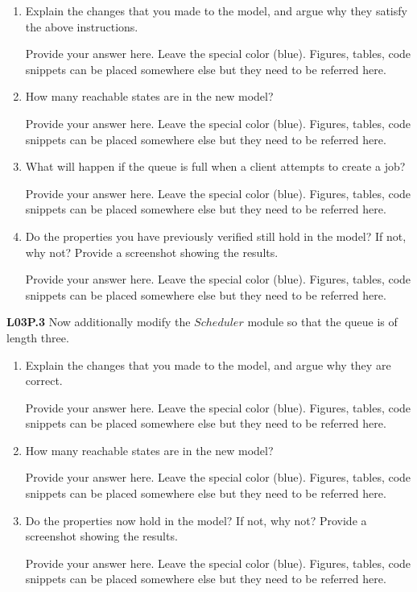 \documentclass[12pt,a4paper]{article}
\newcommand{\prismident}[1]{\mathit{#1}}
\newcommand{\Pname}[1]{\prismident{#1}}
\begin{document}
\begin{description}
\begin{enumerate}[label=\alph*)]
\item Explain the changes that you made to the model, and argue why they satisfy the above instructions.
%
\ifwithanswers
\color{blue}
\par
Provide your answer here. Leave the special color (blue). Figures, tables, code snippets can be placed somewhere else but they need to be referred here.
\color{black}
\fi
%
\item How many reachable states are in the new model?
%
\ifwithanswers
\color{blue}
\par
Provide your answer here. Leave the special color (blue). Figures, tables, code snippets can be placed somewhere else but they need to be referred here.
\color{black}
\fi
%
\item What will happen if the queue is full when a client attempts to create a job?
%
\ifwithanswers
\color{blue}
\par
Provide your answer here. Leave the special color (blue). Figures, tables, code snippets can be placed somewhere else but they need to be referred here.
\color{black}
\fi
%
\item Do the properties you have previously verified still hold in the model? If not, why not? Provide a screenshot showing the results.
%
\ifwithanswers
\color{blue}
\par
Provide your answer here. Leave the special color (blue). Figures, tables, code snippets can be placed somewhere else but they need to be referred here.
\color{black}
\fi
%
\end{enumerate}
\item{\bf L03P.3} Now additionally modify the $\Pname{Scheduler}$ module so that the queue is of length three.
\begin{enumerate}[label=\alph*)]
\item Explain the changes that you made to the model, and argue why they are correct.
%
\ifwithanswers
\color{blue}
\par
Provide your answer here. Leave the special color (blue). Figures, tables, code snippets can be placed somewhere else but they need to be referred here.
\color{black}
\fi
%
\item How many reachable states are in the new model?
%
\ifwithanswers
\color{blue}
\par
Provide your answer here. Leave the special color (blue). Figures, tables, code snippets can be placed somewhere else but they need to be referred here.
\color{black}
\fi
%
\item Do the properties now hold in the model? If not, why not? Provide a screenshot showing the results.
%
\ifwithanswers
\color{blue}
\par
Provide your answer here. Leave the special color (blue). Figures, tables, code snippets can be placed somewhere else but they need to be referred here.
\color{black}
\fi
\end{enumerate}

\end{description}
\end{document}
